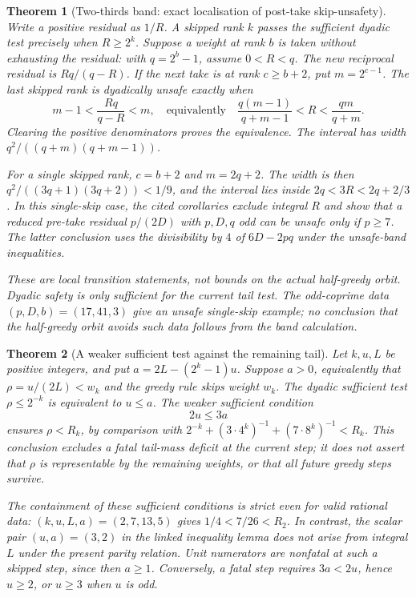\documentclass[11pt]{article}
\theoremstyle{plain}
\newtheorem{thm}{Theorem}[section]
\theoremstyle{definition}
\theoremstyle{remark}
\begin{document}
\begin{thm}[Two-thirds band: exact localisation of post-take skip-unsafety]
\label{thm:two-thirds-band}
Write a positive residual as $1/R$.  A skipped rank $k$ passes
the sufficient dyadic test precisely when $R\ge2^k$.
Suppose a weight at rank $b$ is taken without exhausting the
residual: with $q=2^b-1$, assume $0<R<q$.
The new reciprocal residual is $Rq/(q-R)$.
If the next take is at rank $c\ge b+2$, put $m=2^{c-1}$.
The last skipped rank is dyadically unsafe exactly when
\[
 m-1<\frac{Rq}{q-R}<m,
 \quad\text{equivalently}\quad
 \frac{q(m-1)}{q+m-1}<R<\frac{qm}{q+m}.
\]
Clearing the positive denominators proves the equivalence.
The interval has width $q^2/((q+m)(q+m-1))$.

For a single skipped rank, $c=b+2$ and $m=2q+2$.
The width is then $q^2/((3q+1)(3q+2))<1/9$, and the
interval lies inside $2q<3R<2q+2/3$.
In this single-skip case, the cited corollaries exclude integral
$R$ and show that a reduced pre-take residual $p/(2D)$ with
$p,D,q$ odd can be unsafe only if $p\ge7$.
The latter conclusion uses the divisibility by $4$ of
$6D-2pq$ under the unsafe-band inequalities.

These are local transition statements, not bounds on the actual
half-greedy orbit.  Dyadic safety is only sufficient for the
current tail test.  The odd-coprime data $(p,D,b)=(17,41,3)$
give an unsafe single-skip example; no conclusion that the
half-greedy orbit avoids such data follows from the band calculation.
\end{thm}

\begin{thm}[A weaker sufficient test against the remaining tail]
\label{thm:sharp-fatal-gap}
Let $k,u,L$ be positive integers, and put
$a=2L-(2^k-1)u$.  Suppose $a>0$, equivalently that
$\rho=u/(2L)<w_k$ and the greedy rule skips weight $w_k$.
The dyadic sufficient test $\rho\le2^{-k}$ is equivalent to $u\le a$.
The weaker sufficient condition
\[
 2u\le3a
\]
ensures $\rho<R_k$, by comparison with
$2^{-k}+(3\cdot4^k)^{-1}+(7\cdot8^k)^{-1}<R_k$.
This conclusion excludes a fatal tail-mass deficit at the current step;
it does not assert that $\rho$ is representable by the remaining
weights, or that all future greedy steps survive.

The containment of these sufficient conditions is strict even for
valid rational data: $(k,u,L,a)=(2,7,13,5)$ gives
$1/4<7/26<R_2$.  In contrast, the scalar pair $(u,a)=(3,2)$ in the
linked inequality lemma does not arise from integral $L$ under the
present parity relation.  Unit numerators are nonfatal at such a
skipped step, since then $a\ge1$.  Conversely, a fatal step requires
$3a<2u$, hence $u\ge2$, or $u\ge3$ when $u$ is odd.
\end{thm}
\end{document}
